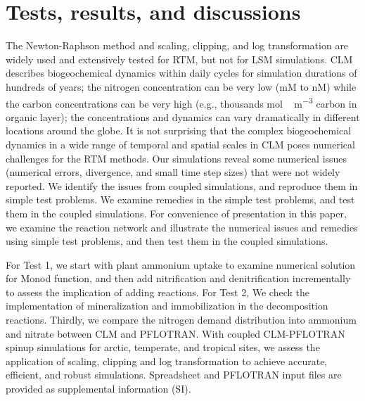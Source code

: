 \documentclass[gmd, manuscript]{copernicus}
\begin{document}
\section{Tests, results, and discussions}
The Newton-Raphson method and scaling, clipping, and log transformation are widely used and extensively tested for RTM, but not for LSM simulations. CLM describes biogeochemical dynamics within daily cycles for simulation durations of hundreds of years; the nitrogen concentration can be very low (\unit{mM} to \unit{nM}) while the carbon concentrations can be very high (e.g., thousands \unit{mol\,m^{-3}} carbon in organic layer); the concentrations and dynamics can vary dramatically in different locations around the globe. It is not surprising that the complex biogeochemical dynamics in a wide range of temporal and spatial scales in CLM poses numerical challenges for the RTM methods. Our simulations reveal some numerical issues (numerical errors, divergence, and small time step sizes) that were not widely reported. We identify the issues from coupled simulations, and reproduce them in simple test problems. We examine remedies in the simple test problems, and test them in the coupled simulations. For convenience of presentation in this paper, we examine the reaction network and illustrate the numerical issues and remedies using simple test problems, and then test them in the coupled simulations. 

For Test 1, we start with plant ammonium uptake to examine numerical solution for Monod function, and then add nitrification and denitrification incrementally to assess the implication of adding reactions. For Test 2, We check the implementation of mineralization and immobilization in the decomposition reactions. Thirdly, we compare the nitrogen demand distribution into ammonium and nitrate between CLM and PFLOTRAN. With coupled CLM-PFLOTRAN spinup simulations for arctic, temperate, and tropical sites, we assess the application of scaling, clipping and log transformation to achieve accurate, efficient, and robust simulations. Spreadsheet and PFLOTRAN input files are provided as supplemental information (SI).
\end{document}
